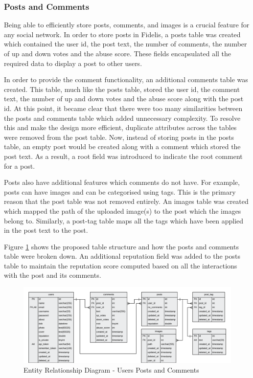 \subsubsection{Posts and Comments}
Being able to efficiently store posts, comments, and images is a crucial feature for any social network. In order to store posts in Fidelis, a posts table was created which contained the user id, the post text, the number of comments, the number of up and down votes and the abuse score. These fields encapsulated all the required data to display a post to other users.

In order to provide the comment functionality, an additional comments table was created. This table, much like the posts table, stored the user id, the comment text, the number of up and down votes and the abuse score along with the post id. At this point, it became clear that there were too many similarities between the posts and comments table which added unnecessary complexity. To resolve this and make the design more efficient, duplicate attributes across the tables were removed from the post table. Now, instead of storing posts in the posts table, an empty post would be created along with a comment which stored the post text. As a result, a root field was introduced to indicate the root comment for a post.

Posts also have additional features which comments do not have. For example, posts can have images and can be categorised using tags. This is the primary reason that the post table was not removed entirely. An images table was created which mapped the path of the uploaded image(s) to the post which the images belong to. Similarly, a post-tag table maps all the tags which have been applied in the post text to the post.

Figure \ref{fig:ERD_Posts} shows the proposed table structure and how the posts and comments table were broken down. An additional reputation field was added to the posts table to maintain the reputation score computed based on all the interactions with the post and its comments.

\begin{figure}[H]
  \centering
  \includegraphics[width=1.0\textwidth]{Images/Design/Database/Posts}
  \caption{Entity Relationship Diagram - Users Posts and Comments} \label{fig:ERD_Posts}
\end{figure}

